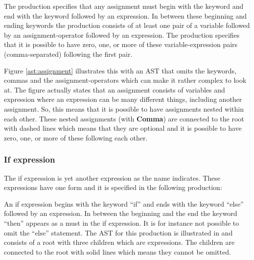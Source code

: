 \begin{ebnf}%
\end{ebnf}%

The production specifies that any assignment must begin with the keyword  and end with the keyword  followed by an expression. In between these beginning and ending keywords the production consists of at least one pair of a variable followed by an assignment-operator followed by an expression. The production specifies that it is possible to have zero, one, or more of these variable-expression pairs (comma-separated) following the first pair.%

%

Figure \ref{ast:assignment} illustrates this with an AST that omits the keywords, commas and the assignment-operators which can make it rather complex to look at. The figure actually states that an assignment consists of variables and expression where an expression can be many different things, including another assignment. So, this means that it is possible to have assignments nested within each other. These nested assignments (with \textbf{Comma}) are connected to the root with dashed lines which means that they are optional and it is possible to have zero, one, or more of these following each other.%

\subsubsection{If expression}%

The if expression is yet another expression as the name indicates. These expressions have one form and it is specified in the following production:%

\begin{ebnf}%
%
\end{ebnf}%

An if expression begins with the keyword ``if'' and ends with the keyword ``else'' followed by an expression. In between the beginning and the end the keyword ``then'' appears as a must in the if expression. It is for instance not possible to omit the ``else'' statement. The AST for this production is illustrated in  and consists of a root with three children which are expressions. The children are connected to the root with solid lines which means they cannot be omitted.%

